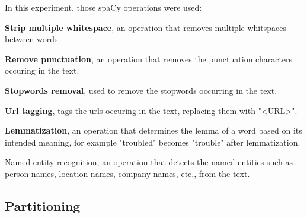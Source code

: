 \documentclass[12pt, a4paper]{article}
\begin{document}
\hfill\break
In this experiment, those spaCy operations were used:

\textbf{Strip multiple whitespace}, an operation that removes multiple whitspaces between words.


\textbf{Remove punctuation}, an operation that removes the punctuation characters occuring in the text.

\textbf{Stopwords removal}, used to remove the stopwords occurring in the text.


\textbf{Url tagging}, tags the urls occuring in the text, replacing them with "<URL>".


\textbf{Lemmatization}, an operation that determines the lemma of a word based on its intended meaning, for example "troubled" becomes "trouble" after lemmatization.


Named entity recognition, an operation that detects the named entities such as person names, location names, company names, etc., from the text.






\subsection{Partitioning}\label{subsec:partitioning}
\end{document}
